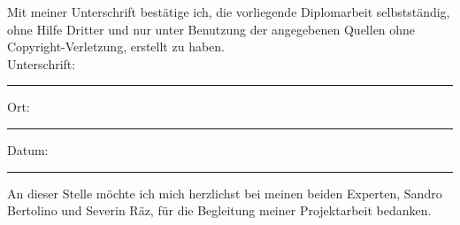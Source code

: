 \documentclass[
  11pt, %
  twoside, %
  ngerman, %
  singlespacing, %
  liststotoc, %
  headsepline, %
]{MastersDoctoralThesis} %
\begin{document}
\newpage


\begin{declaration}
  \addchaptertocentry{\authorshipname} %
  \noindent Mit meiner Unterschrift bestätige ich, die vorliegende Diplomarbeit
  selbstständig, ohne Hilfe Dritter und nur unter Benutzung der angegebenen
  Quellen ohne Copyright-Verletzung, erstellt zu haben.\\

  \noindent Unterschrift:\\
  \rule[0.5em]{25em}{0.5pt}

  \noindent Ort:\\
  \rule[0.5em]{25em}{0.5pt}

  \noindent Datum:\\
  \rule[0.5em]{25em}{0.5pt}
\end{declaration}

\blankpage
\blankpage


\begin{acknowledgements}
  \addchaptertocentry{\acknowledgementname} %

  An dieser Stelle möchte ich mich herzlichst bei meinen beiden Experten,
  Sandro Bertolino und Severin Räz, für die Begleitung meiner Projektarbeit
  bedanken.
\end{acknowledgements}


\tableofcontents %

\listoffigures %

\listoftables %

\end{document}
